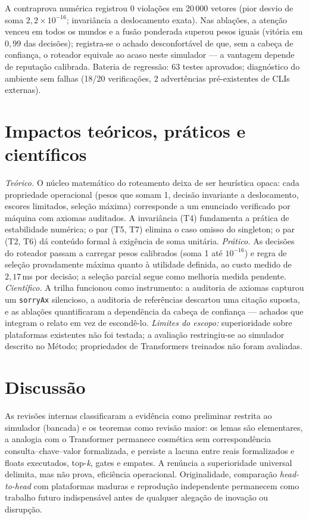 \documentclass[12pt,a4paper]{article}
\begin{document}
A contraprova numérica registrou 0 violações em 20\,000 vetores (pior desvio
de soma $2{,}2\times10^{-16}$; invariância a deslocamento exata). Nas
ablações, a atenção venceu em todos os mundos e a fusão ponderada superou
pesos iguais (vitória em $0{,}99$ das decisões); registra-se o achado
desconfortável de que, sem a cabeça de confiança, o roteador equivale ao
acaso neste simulador --- a vantagem depende de reputação calibrada.
Bateria de regressão: 63 testes aprovados; diagnóstico do ambiente sem
falhas (18/20 verificações, 2 advertências pré-existentes de CLIs externas).

\section{Impactos teóricos, práticos e científicos}

\textit{Teórico.} O núcleo matemático do roteamento deixa de ser heurística
opaca: cada propriedade operacional (pesos que somam 1, decisão invariante a
deslocamento, escores limitados, seleção máxima) corresponde a um enunciado
verificado por máquina com axiomas auditados. A invariância (T4) fundamenta a
prática de estabilidade numérica; o par (T5, T7) elimina o caso omisso do
singleton; o par (T2, T6) dá conteúdo formal à exigência de soma unitária.
\textit{Prático.} As decisões do roteador passam a carregar pesos calibrados
(soma 1 até $10^{-16}$) e regra de seleção provadamente máxima quanto à
utilidade definida, ao custo medido de $2{,}17$\,ms por decisão; a seleção
parcial segue como melhoria medida pendente. \textit{Científico.} A trilha
funcionou como instrumento: a auditoria de axiomas capturou um
\texttt{sorryAx} silencioso, a auditoria de referências descartou uma citação
suposta, e as ablações quantificaram a dependência da cabeça de confiança ---
achados que integram o relato em vez de escondê-lo. \textit{Limites do
escopo:} superioridade sobre plataformas existentes não foi testada; a
avaliação restringiu-se ao simulador descrito no Método; propriedades de
Transformers treinados não foram avaliadas.

\section{Discussão}

As revisões internas classificaram a evidência como preliminar restrita ao
simulador (bancada) e os teoremas como revisão maior: os lemas são
elementares, a analogia com o Transformer permanece cosmética sem
correspondência consulta--chave--valor formalizada, e persiste a lacuna entre
reais formalizados e floats executados, top-\textit{k}, gates e empates. A
renúncia a superioridade universal delimita, mas não prova, eficiência
operacional. Originalidade, comparação \textit{head-to-head} com plataformas
maduras e reprodução independente permanecem como trabalho futuro
indispensável antes de qualquer alegação de inovação ou disrupção.
\end{document}
